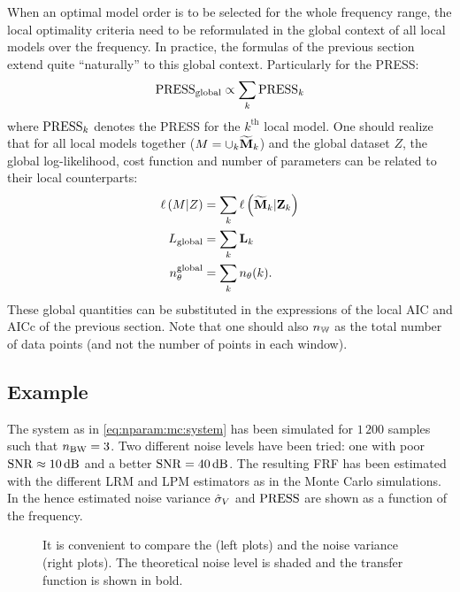 When an optimal model order is to be selected for the whole frequency range, the local optimality criteria need to be reformulated in the global context of all local models over the frequency.
In practice, the formulas of the previous section extend quite ``naturally'' to this global context.
Particularly for the \gls{PRESS}:
\begin{equation}
  \PRESS_{\mathrm{global}} \propto \sum_k \PRESS_k
\end{equation}
where $\PRESS_k$ denotes the \gls{PRESS} for the $k^{\text{th}}$ local model.
One should realize that for all local models together ($M =  \cup_k \LocalModel[k]{M}$) and the global dataset $Z$, the global log-likelihood, cost function and number of parameters can be related to their local counterparts:
\begin{align}
  \loglikelihood{M | Z}   &= \sum_k \loglikelihood{\LocalModel[k]{M} | \LocalVector{Z}_{k}} \\
  L_{\mathrm{global}} &= \sum_k \LocalVector{L}_k\\
  \nth^{\mathrm{global}} &= \sum_k \nth(k)
  \text{.}
\end{align}
These global quantities can be substituted in the expressions of the local \gls{AIC} and \gls{AICc} of the previous section. 
Note that one should also $\nWind$ as the total number of data points (and not the number of points in each window).

\subsection{Example}
The system as in \eqref{eq:nparam:mc:system} has been simulated for $1\,200$ samples such that $\nBW=3$.
Two different noise levels have been tried: one with poor $\SNR\approx10\unit{dB}$ and a better $\SNR=40\unit{dB}$.
The resulting \gls{FRF} has been estimated with the different \gls{LRM} and \gls{LPM} estimators as in the Monte Carlo simulations.
In  the hence estimated noise variance $\sampleStd{V}$ and $\PRESS$  are shown as a function of the frequency.

\begin{figure}
  \centering
  \setlength{\figurewidth}{0.85\columnwidth}
  \setlength{\figureheight}{1.24\figurewidth}
  
  \caption[Output spectrum for local modeling, together the PRESS statistic]{It is convenient to compare the  (left plots) and the noise variance (right plots). The theoretical noise level is shaded and the transfer function is shown in bold.}
  \label{fig:nparam:PRESS}
\end{figure}

